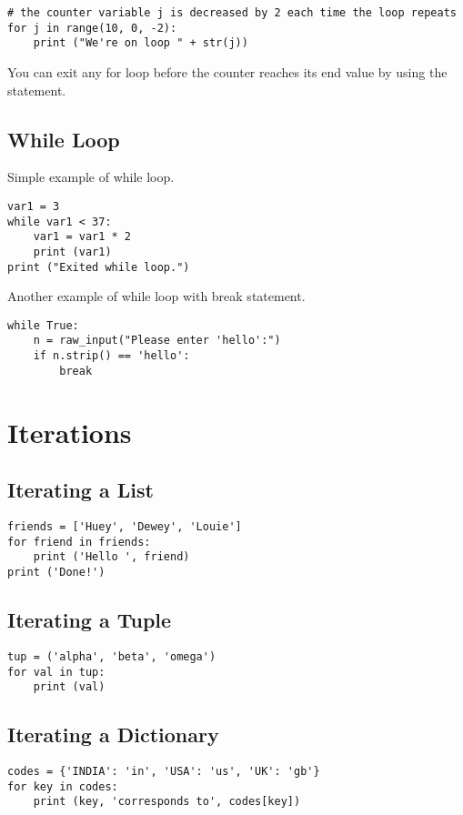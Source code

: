 \documentclass[a4paper,9pt]{extarticle}
\begin{document}
\begin{multicols*}{2}
\begin{lstlisting}
# the counter variable j is decreased by 2 each time the loop repeats
for j in range(10, 0, -2):
    print ("We're on loop " + str(j))
\end{lstlisting}

You can exit any for loop before the counter reaches its end value by using the  statement.

\subsection{While Loop}
Simple example of while loop.
\begin{lstlisting}
var1 = 3
while var1 < 37:
    var1 = var1 * 2
    print (var1)
print ("Exited while loop.")
\end{lstlisting}
\vspace{5 mm}
Another example of while loop with break statement.
\begin{lstlisting}
while True:
    n = raw_input("Please enter 'hello':")
    if n.strip() == 'hello':
        break
\end{lstlisting}

\section{Iterations}

\subsection{Iterating a List}
\begin{lstlisting}
friends = ['Huey', 'Dewey', 'Louie']
for friend in friends:
    print ('Hello ', friend)
print ('Done!')
\end{lstlisting}

\subsection{Iterating a Tuple}
\begin{lstlisting}
tup = ('alpha', 'beta', 'omega')
for val in tup:
    print (val)
\end{lstlisting}

\subsection{Iterating a Dictionary}
\begin{lstlisting}
codes = {'INDIA': 'in', 'USA': 'us', 'UK': 'gb'}
for key in codes:
    print (key, 'corresponds to', codes[key])


\end{lstlisting}
\end{multicols*}
\end{document}

